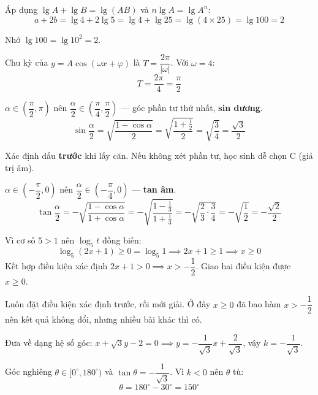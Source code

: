 \documentclass[11pt, a4paper]{article}
\begin{document}
\begin{dapan}[8 — Đáp án C]
Áp dụng $\lg A+\lg B=\lg(AB)$ và $n\lg A=\lg A^n$:
\[
a+2b=\lg 4+2\lg 5=\lg 4+\lg 25=\lg(4\times 25)=\lg 100=2
\]

 Nhớ $\lg 100 = \lg 10^2 = 2$.
\end{dapan}

\begin{dapan}[9 — Đáp án B]
Chu kỳ của $y=A\cos(\omega x+\varphi)$ là $T=\dfrac{2\pi}{|\omega|}$. Với $\omega=4$:
\[
T=\frac{2\pi}{4}=\frac{\pi}{2}
\]
\end{dapan}

\begin{dapan}[10 — Đáp án A]
$\alpha \in \left(\dfrac{\pi}{2},\pi\right)$ nên $\dfrac{\alpha}{2} \in \left(\dfrac{\pi}{4},\dfrac{\pi}{2}\right)$ — góc phần tư thứ nhất, \textbf{sin dương}.
\[
\sin\frac{\alpha}{2}=\sqrt{\frac{1-\cos\alpha}{2}}=\sqrt{\frac{1+\frac{1}{2}}{2}}=\sqrt{\frac{3}{4}}=\frac{\sqrt{3}}{2}
\]

 Xác định dấu \textbf{trước} khi lấy căn. Nếu không xét phần tư, học sinh dễ chọn C (giá trị âm).
\end{dapan}

\begin{dapan}[11 — Đáp án C]
$\alpha \in \left(-\dfrac{\pi}{2},0\right)$ nên $\dfrac{\alpha}{2} \in \left(-\dfrac{\pi}{4},0\right)$ — \textbf{tan âm}.
\[
\tan\frac{\alpha}{2}=-\sqrt{\frac{1-\cos\alpha}{1+\cos\alpha}}=-\sqrt{\frac{1-\frac{1}{3}}{1+\frac{1}{3}}}=-\sqrt{\frac{2}{3}\cdot\frac{3}{4}}=-\sqrt{\frac{1}{2}}=-\frac{\sqrt{2}}{2}
\]
\end{dapan}

\begin{dapan}[12 — Đáp án D]
Vì cơ số $5>1$ nên $\log_5 t$ đồng biến:
\[
\log_5(2x+1)\ge 0=\log_5 1 \implies 2x+1\ge 1 \implies x\ge 0
\]
Kết hợp điều kiện xác định $2x+1>0 \implies x>-\dfrac{1}{2}$. Giao hai điều kiện được $x\ge 0$.

 Luôn đặt điều kiện xác định trước, rồi mới giải. Ở đây $x\ge 0$ đã bao hàm $x>-\dfrac{1}{2}$ nên kết quả không đổi, nhưng nhiều bài khác thì có.
\end{dapan}

\clearpage
{}

\begin{dapan}[13 — Đáp án C]
Đưa về dạng hệ số góc: $x+\sqrt{3}y-2=0 \implies y=-\dfrac{1}{\sqrt{3}}x+\dfrac{2}{\sqrt{3}}$, vậy $k=-\dfrac{1}{\sqrt{3}}$.

Góc nghiêng $\theta \in [0^\circ,180^\circ)$ và $\tan\theta=-\dfrac{1}{\sqrt{3}}$. Vì $k<0$ nên $\theta$ tù:
\[
\theta=180^\circ-30^\circ=150^\circ
\]
\end{dapan}
\end{document}
